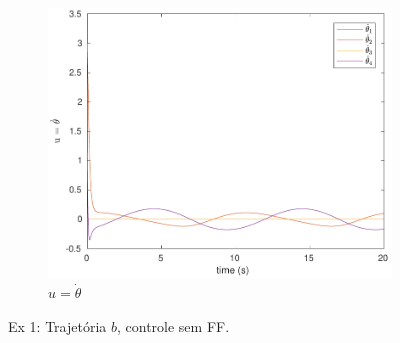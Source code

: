 \documentclass[a4paper,11pt]{article}
\theoremstyle{mytheor}
\begin{document}
\begin{figure}[!ht]
\begin{minipage}{\linewidth}
\begin{subfigure}[b]{0.4\textwidth}
    \end{subfigure}
    \begin{subfigure}[b]{0.4\textwidth}
    \includegraphics[width=1\textwidth]{figs/ex1_b_2_dq.pdf}
    \caption{$u = \dot{\theta}$}
    \label{fig:ex1_b_2_dq}
    \end{subfigure}
  \end{minipage}
\caption{Ex 1: Trajetória $b$, controle sem FF.}
\label{fig:ex1_b_2}
\end{figure}
\end{document}
